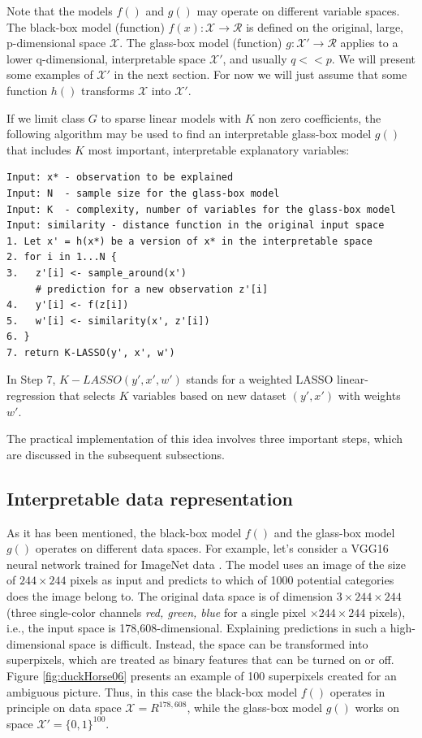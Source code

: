 \documentclass[]{krantz}
\begin{document}
Note that the models \(f()\) and \(g()\) may operate on different variable spaces. The black-box model (function) \(f(x):\mathcal X \rightarrow \mathcal R\) is defined on the original, large, p-dimensional space \(\mathcal X\). The glass-box model (function) \(g:\mathcal X' \rightarrow \mathcal R\) applies to a lower q-dimensional, interpretable space \(\mathcal X'\), and usually \(q << p\). We will present some examples of \(\mathcal X'\) in the next section. For now we will just assume that some function \(h()\) transforms \(\mathcal X\) into \(\mathcal X'\).

If we limit class \(G\) to sparse linear models with \(K\) non zero coefficients, the following algorithm may be used to find an interpretable glass-box model \(g()\) that includes \(K\) most important, interpretable explanatory variables:

\begin{verbatim}
Input: x* - observation to be explained
Input: N  - sample size for the glass-box model 
Input: K  - complexity, number of variables for the glass-box model
Input: similarity - distance function in the original input space
1. Let x' = h(x*) be a version of x* in the interpretable space
2. for i in 1...N {
3.   z'[i] <- sample_around(x') 
     # prediction for a new observation z'[i] 
4.   y'[i] <- f(z[i]) 
5.   w'[i] <- similarity(x', z'[i]) 
6. }
7. return K-LASSO(y', x', w')
\end{verbatim}

In Step 7, \(K-LASSO(y', x', w')\) stands for a weighted LASSO linear-regression that selects \(K\) variables based on new dataset \((y', x')\) with weights \(w'\).

The practical implementation of this idea involves three important steps, which are discussed in the subsequent subsections.

\hypertarget{interpretable-data-representation}{%
\subsection{Interpretable data representation}\label{interpretable-data-representation}}

As it has been mentioned, the black-box model \(f()\) and the glass-box model \(g()\) operates on different data spaces. For example, let's consider a VGG16 neural network \citep{Simonyan15} trained for ImageNet data \citep{ImageNet}. The model uses an image of the size of \(244 \times 244\) pixels as input and predicts to which of 1000 potential categories does the image belong to. The original data space is of dimension \(3 \times 244 \times 244\) (three single-color channels \emph{red, green, blue} for a single pixel \(\times 244 \times 244\) pixels), i.e., the input space is 178,608-dimensional. Explaining predictions in such a high-dimensional space is difficult. Instead, the space can be transformed into superpixels, which are treated as binary features that can be turned on or off. Figure \ref{fig:duckHorse06} presents an example of 100 superpixels created for an ambiguous picture. Thus, in this case the black-box model \(f()\) operates in principle on data space \(\mathcal X=R^{178,608}\), while the glass-box model \(g()\) works on space \(\mathcal X' = \{0,1\}^{100}\).
\end{document}
